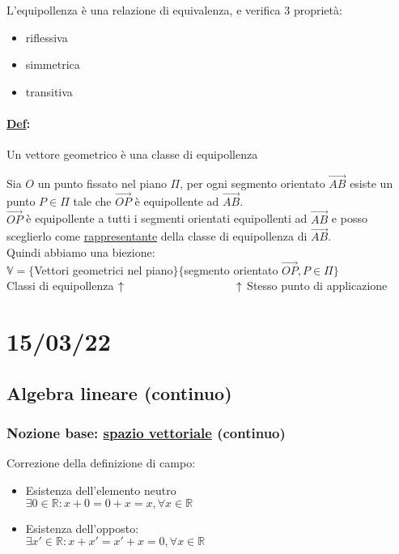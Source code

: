 \documentclass{article}
\newcommand{\ul}[1]{\underline{#1}}
\newcommand{\R}{\mathbb{R}}
\newcommand{\Def}[2]{\paragraph{\ul{Def}:}#1\\\hspace*{3em}\begin{minipage}{.8\textwidth}#2\end{minipage}}
\begin{document}
\vspace*{2em}
L'equipollenza è una relazione di equivalenza, e verifica 3 proprietà:
\begin{itemize}
	\item riflessiva
	\item simmetrica
	\item transitiva
\end{itemize}
\Def{Un vettore geometrico è una classe di equipollenza}
{Sia $O$ un punto fissato nel piano $\Pi$, per ogni segmento orientato $\vec{AB}$ esiste un punto $P\in\Pi$ tale che $\vec{OP}$ è equipollente ad $\vec{AB}$.\\
	$\vec{OP}$ è equipollente a tutti i segmenti orientati equipollenti ad $\vec{AB}$ e posso sceglierlo come \ul{rappresentante} della classe di equipollenza di $\vec{AB}$.\\
	Quindi abbiamo una biezione:\\
	$\mathbb{V}=\{$Vettori geometrici nel piano$\}\{$segmento orientato $\vec{OP},P\in\Pi\}$\\
	Classi di equipollenza $\uparrow\hspace*{10em}\uparrow$ Stesso punto di applicazione}
\section{15/03/22}
\subsection{Algebra lineare (continuo)}
\subsubsection*{Nozione base: \ul{spazio vettoriale} (continuo)}
Correzione della definizione di campo:
\begin{itemize}
	\item Esistenza dell'elemento neutro\\$\exists0\in\R:x+0=0+x=x,\forall x\in\R$
	\item Esistenza dell'opposto:\\$\exists x'\in\R:x+x'=x'+x=0,\forall x\in\R$
\end{itemize}
\hrulefill
\end{document}
